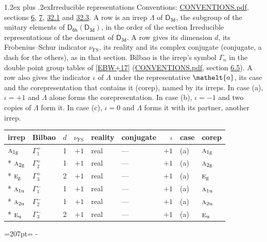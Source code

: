 \documentclass[10pt,a4paper]{article}
\makeatletter
\renewcommand\section{\@startsection{section}{1}{\z@}{-3ex plus -1ex minus -.2ex}%
  {1.2ex plus .2ex}{\normalfont\large\sffamily\bfseries\color{parttitle}}}
\newcommand{\needspace}[1]{\par\penalty-100\begingroup\dimen0=#1\relax\dimen2=\pagegoal
  \advance\dimen2-\pagetotal\ifdim\dimen0>\dimen2\relax\ifdim\dimen2>0pt\vfil\break\fi\fi
  \endgroup}
\numberwithin{equation}{section}
\newcommand{\eltfont}[1]{{\let\sigma\eltsigma\mathelt{#1}}}
\newcommand{\grp}[1]{\mathsf{#1}}
\newcommand{\irr}[1]{\text{\normalfont\scshape #1}}
\newcommand{\elt}[1]{\eltfont{#1}}
\newcommand{\ptag}[1]{\mathrm{#1}}
\newcommand{\fsind}{\nu_{\mathrm{FS}}}
\makeatother
\begin{document}
\section{Irreducible representations}\label{s:irreps}
Conventions: \href{../../CONVENTIONS.pdf}{CONVENTIONS.pdf}, sections \href{../../../rotation/CONVENTIONS.pdf\#conv.6}{6}, \href{../../../rotation/CONVENTIONS.pdf\#conv.7}{7}, \href{../../CONVENTIONS.pdf\#conv.32.1}{32.1} and \href{../../CONVENTIONS.pdf\#conv.32.3}{32.3}.
\leavevmode\label{n:irrep.Delta}A row is an irrep $\Lambda$ of $\grp{D_{3d}}$, the subgroup of the unitary elements of $\grp{D_{6h}}(\grp{D_{3d}})$, in the order of the section Irreducible representations of the document of \href{../../../rotation/data/pdf/D3d.pdf}{$\grp{D_{3d}}$}. \label{n:index.dimension}\label{n:index.frobenius}\label{n:head.irrep}\label{n:head.reality}\label{n:head.conjugate}A row gives its dimension $d$, its Frobenius--Schur indicator $\fsind$, its reality and its complex conjugate (conjugate, a dash for the others), as in that section. \label{n:head.bilbao}\label{n:irrep.alias.gamma}Bilbao is the irrep's symbol $\Gamma_n$ in the double point group tables of [\href{../../../REFERENCES.pdf\#ref.EBW+17}{EBW+17}] (\href{../../CONVENTIONS.pdf}{CONVENTIONS.pdf}, section \href{../../../rotation/CONVENTIONS.pdf\#conv.6.5}{6.5}). \label{n:head.case.corep}\label{n:head.corep}A row also gives the indicator $\iota$ of $\Lambda$ under the representative $\elt{a}$, its case and the corepresentation that contains it (corep), named by its irreps. In case (a), $\iota = +1$ and $\Lambda$ alone forms the corepresentation. In case (b), $\iota = -1$ and two copies of $\Lambda$ form it. In case (c), $\iota = 0$ and $\Lambda$ forms it with its partner, another irrep.
\setlength{\emergencystretch}{2em}\par\setlength{\emergencystretch}{0pt}
{\small\renewcommand{\arraystretch}{1.25}\setlength{\tabcolsep}{4pt}\begin{longtable}{@{}llrrllrll@{}}\toprule
irrep & Bilbao & $d$ & $\fsind$ & reality & conjugate & $\iota$ & case & corep\\\midrule\endhead
\bottomrule\endfoot\endlastfoot
$\irr{a}_{1\ptag{g}}$ & $\Gamma_{1}^{+}$ & 1 & $+1$ & real & --- & $+1$ & (a) & $\irr{a}_{1\ptag{g}}$\\*
$\irr{a}_{2\ptag{g}}$ & $\Gamma_{2}^{+}$ & 1 & $+1$ & real & --- & $+1$ & (a) & $\irr{a}_{2\ptag{g}}$\\*
$\irr{e}_{\ptag{g}}$ & $\Gamma_{3}^{+}$ & 2 & $+1$ & real & --- & $+1$ & (a) & $\irr{e}_{\ptag{g}}$\\*
$\irr{a}_{1\ptag{u}}$ & $\Gamma_{1}^{-}$ & 1 & $+1$ & real & --- & $+1$ & (a) & $\irr{a}_{1\ptag{u}}$\\*
$\irr{a}_{2\ptag{u}}$ & $\Gamma_{2}^{-}$ & 1 & $+1$ & real & --- & $+1$ & (a) & $\irr{a}_{2\ptag{u}}$\\*
$\irr{e}_{\ptag{u}}$ & $\Gamma_{3}^{-}$ & 2 & $+1$ & real & --- & $+1$ & (a) & $\irr{e}_{\ptag{u}}$\\
\bottomrule\end{longtable}}
\needspace{207pt}
\end{document}
